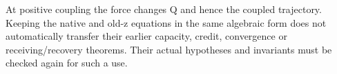 At positive coupling the force changes Q and hence the coupled trajectory. Keeping the native and old-z equations in the same algebraic form does not automatically transfer their earlier capacity, credit, convergence or receiving/recovery theorems. Their actual hypotheses and invariants must be checked again for such a use.

